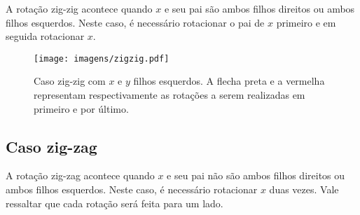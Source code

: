 A rotação zig-zig acontece quando $x$ e seu pai são ambos filhos direitos ou ambos filhos esquerdos. Neste caso, é necessário rotacionar o pai de $x$ primeiro e em seguida rotacionar $x$.

\begin{figure}[ht]
    \centering
    \texttt{[image: imagens/zigzig.pdf]}
    \label{fig:zigzig}

\caption{Caso zig-zig com $x$ e $y$ filhos esquerdos. A flecha preta e a vermelha representam respectivamente as rotações a serem realizadas em primeiro e por último.}
\end{figure}

\subsection{Caso zig-zag}

A rotação zig-zag acontece quando $x$ e seu pai não são ambos filhos direitos ou ambos filhos esquerdos. Neste caso, é necessário rotacionar $x$ duas vezes. Vale ressaltar que cada rotação será feita para um lado.



    
    
    
